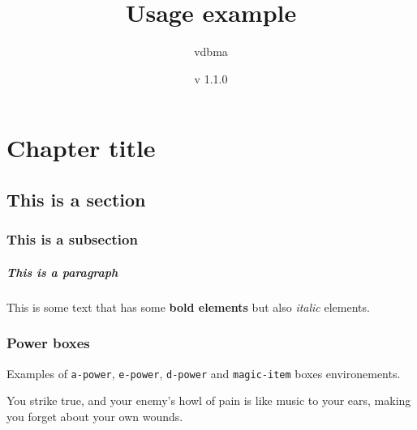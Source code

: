 \documentclass[mmgreen]{dnd4e}
\title{Usage example}
\author{vdbma}
\date{v 1.1.0}
\begin{document}
\maketitle

\tableofcontents

\chapter{Chapter title}




\section{This is a section}

\subsection{This is a subsection}

\paragraph{This is a paragraph} This is some text that has some \textbf{bold elements} but also \textit{italic} elements.

\subsection{Power boxes}

Examples of \texttt{a-power}, \texttt{e-power}, \texttt{d-power} and
 \texttt{magic-item} boxes environements.

\begin{a-power}{}

	\begin{flavor}
		You strike true, and your enemy’s howl of pain is like music to your ears,
		making you forget about your own wounds.
	\end{flavor}


	\begin{beigeline}

	\end{beigeline}

\end{a-power}
\end{document}
